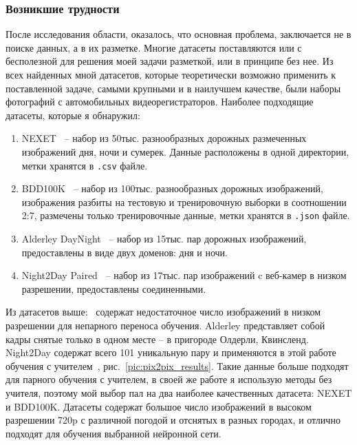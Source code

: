 \documentclass[11pt,a4paper]{extarticle}
\begin{document}
{		\subsubsection*{Возникшие трудности}\label{sec:difficulties}

			После исследования области, оказалось, что основная проблема, заключается не в поиске данных, а в их разметке. Многие датасеты поставляются или с бесполезной для решения моей задачи разметкой, или в принципе без нее.
			Из всех найденных мной датасетов, которые теоретически возможно применить к поставленной задаче, самыми крупными и в наилучшем качестве, были наборы фотографий с автомобильных видеорегистраторов.
			Наиболее подходящие датасеты, которые я обнаружил: 
			
			\begin{enumerate}
				\item NEXET~\cite{data:nexet} -- набор из 50тыс. разнообразных дорожных размеченных изображений дня, ночи и сумерек. Данные расположены в одной директории, метки хранятся в \texttt{.csv} файле.
				\item BDD100K~\cite{data:bdd100k} -- набор из 100тыс. разнообразных дорожных изображений, изображения разбиты на тестовую и тренировочную выборки в соотношении 2:7, размечены только тренировочные данные, метки хранятся в \texttt{.json} файле.
				\item Alderley DayNight~\cite{data:alderley} -- набор из 15тыс. пар дорожных изображений, предоставлены в виде двух доменов: дня и ночи. 
				\item Night2Day Paired~\cite{data:paired_night2day} -- набор из 17тыс. пар изображений c веб-камер в низком разрешении, предоставлены соединенными.
			\end{enumerate}
			\noindent
			Из датасетов выше:~\cite{data:alderley,data:paired_night2day} содержат недостаточное число изображений в низком разрешении для непарного переноса обучения. Alderley представляет собой кадры снятые только в одном месте -- в пригороде Олдерли, Квинсленд.
			Night2Day содержат всего 101 уникальную пару и применяются в этой работе обучения с учителем~\cite{pix2pix}, рис.~\ref{pic:pix2pix_results}.
			Такие данные больше подходят для парного обучения с учителем, в своей же работе я использую методы без учителя, поэтому мой выбор пал на два наиболее качественных датасета: NEXET и BDD100K.
			Датасеты содержат большое число изображений в высоком разрешении 720p с различной погодой и отснятых в разных городах, и отлично подходят для обучения выбранной нейронной сети.
		
}
\end{document}
